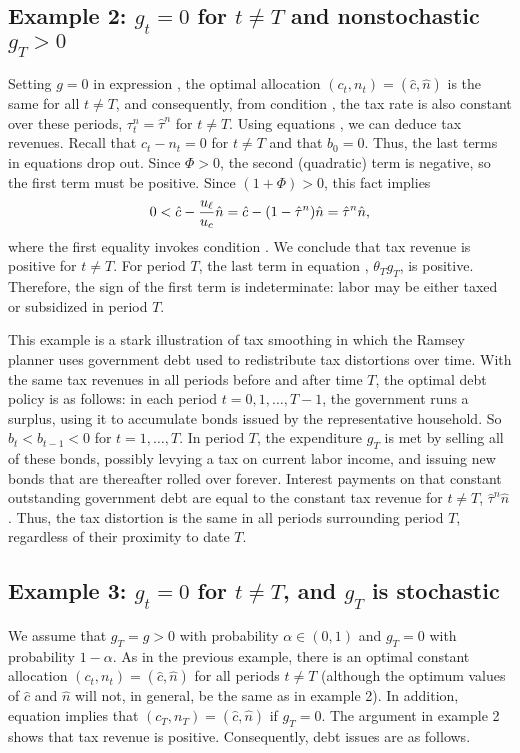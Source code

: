 \subsection{Example 2: $g_t=0$ for $t\not= T$ and nonstochastic $g_T>0$}
Setting $g=0$ in expression , the optimal
allocation  $(c_t,n_t)=(\hat c, \hat n)$ is the same  for all $t\not= T$,
and consequently, from condition , the tax rate is also constant
over these periods, $\tau^n_t=\hat \tau^n$ for $t\not= T$. Using
equations , we can deduce tax revenues.
Recall that $c_t-n_t=0$ for $t\neq T$  and that $b_0=0$. Thus, the
last terms in equations 
drop out. Since $\Phi>0$, the second (quadratic) term is negative, so
the first term must be positive. Since $(1+\Phi)>0$, this fact implies
$$
0<\hat c - {u_{\ell} \over u_c} \hat n = \hat c - (1-\hat \tau^n) \hat n
 = \hat \tau^n \hat n,
$$
where the first equality invokes condition . We conclude that
tax revenue is positive for $t\not= T$. For period $T$, the last term
in equation , $\theta_T g_T$, is positive. Therefore, the sign
of the first term is indeterminate: labor may be either taxed or
subsidized in period $T$.

This example is a stark illustration of tax smoothing in which the Ramsey planner uses government  debt
used to redistribute tax distortions over time. With the same tax
revenues in all periods before and after time $T$, the optimal debt
policy is as follows: in each period $t=0,1, \ldots ,T-1$, the government
runs a surplus, using it to accumulate  bonds issued by the representative household.
So $b_t < b_{t-1} < 0$ for $t = 1, \ldots , T$.
In period $T$, the expenditure $g_T$ is met by selling all of these
bonds, possibly levying a tax on current labor income, and issuing
new bonds that are thereafter rolled over forever. Interest payments
on that constant outstanding government debt are equal to the constant
tax revenue for $t\not= T$,
$\hat \tau^n \hat n$. Thus, the tax distortion is the same in all periods
surrounding period $T$, regardless of their proximity to  date $T$. %

\subsection{Example 3: $g_t=0$ for $t\not= T$, and $g_T$ is stochastic}
We assume that $g_T=g>0$ with probability $\alpha \in (0,1)$ and $g_T=0$ with
probability $1-\alpha$.  As in the previous example, there is an
optimal constant allocation $(c_t,n_t)=(\hat c, \hat n)$ for all
periods $t\not= T$ (although the optimum values of $\hat c$ and
$\hat n$ will not, in general, be the same as in example 2). In addition,
equation  implies that $(c_T,n_T)=(\hat c, \hat n)$ if $g_T=0$.
The argument in example 2 shows that tax revenue is positive. Consequently, debt issues are as follows.


